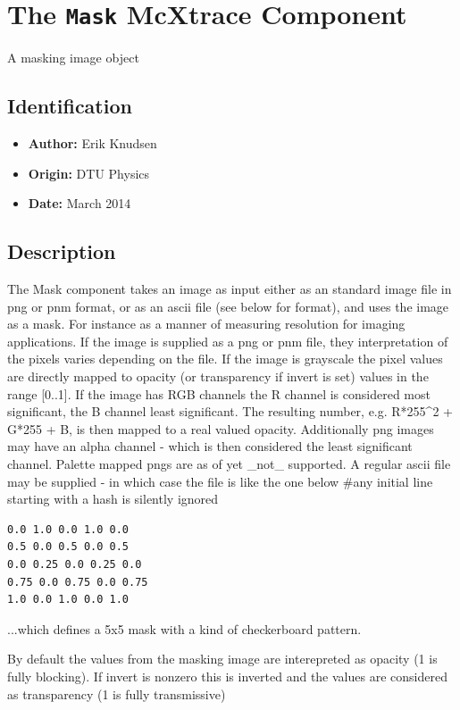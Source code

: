 \section{The \texttt{Mask} McXtrace Component}
A masking image object

\subsection*{Identification}
\begin{itemize}
  \item \textbf{Author:} Erik Knudsen
  \item \textbf{Origin:} DTU Physics
  \item \textbf{Date:} March  2014
\end{itemize}

\subsection*{Description}
The Mask component takes an image as input either as an standard image file in png or pnm format, or as an ascii file (see below for format), and uses the image as a mask. For instance as a manner of measuring resolution for imaging applications. If the image is supplied as a png or pnm file, they interpretation of the pixels varies depending on the file. If the image is grayscale the pixel values are directly mapped to opacity (or transparency if invert is set) values in the range [0..1]. If the image has RGB channels the R channel is considered most significant, the B channel least significant. The resulting number, e.g. R*255\textasciicircum{}2 + G*255 + B, is then mapped to a real valued opacity. Additionally png images may have an alpha channel - which is then considered the least significant channel. Palette mapped pngs are as of yet \_not\_ supported. A regular ascii file may be supplied - in which case the file is like the one below \#any initial line starting with a hash is silently ignored

\begin{verbatim}
0.0 1.0 0.0 1.0 0.0
0.5 0.0 0.5 0.0 0.5
0.0 0.25 0.0 0.25 0.0
0.75 0.0 0.75 0.0 0.75
1.0 0.0 1.0 0.0 1.0
\end{verbatim}

...which defines a 5x5 mask with a kind of checkerboard pattern.

By default the values from the masking image are interepreted as opacity (1 is fully blocking). If invert is nonzero this is inverted and the values are considered as transparency (1 is fully transmissive)

